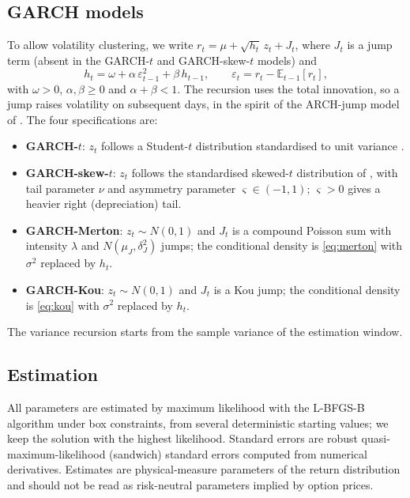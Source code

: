 \documentclass[11pt]{article}
\newcommand{\E}{\mathbb{E}}
\begin{document}
\subsection{GARCH models}

To allow volatility clustering, we write $r_t = \mu + \sqrt{h_t}\, z_t + J_t$, where $J_t$ is a jump term (absent in the GARCH-$t$ and GARCH-skew-$t$ models) and
\begin{equation}\label{eq:garch}
h_t = \omega + \alpha\, \varepsilon_{t-1}^2 + \beta\, h_{t-1}, \qquad \varepsilon_t = r_t - \E_{t-1}[r_t],
\end{equation}
with $\omega>0$, $\alpha,\beta\ge 0$ and $\alpha+\beta<1$. The recursion uses the total innovation, so a jump raises volatility on subsequent days, in the spirit of the ARCH-jump model of \citet{jorion1988}. The four specifications are:
\begin{itemize}
\item \textbf{GARCH-$t$}: $z_t$ follows a Student-$t$ distribution standardised to unit variance \citep{bollerslev1987}.
\item \textbf{GARCH-skew-$t$}: $z_t$ follows the standardised skewed-$t$ distribution of \citet{hansen1994}, with tail parameter $\nu$ and asymmetry parameter $\varsigma\in(-1,1)$; $\varsigma>0$ gives a heavier right (depreciation) tail.
\item \textbf{GARCH-Merton}: $z_t\sim N(0,1)$ and $J_t$ is a compound Poisson sum with intensity $\lambda$ and $N(\mu_J,\delta_J^2)$ jumps; the conditional density is \eqref{eq:merton} with $\sigma^2$ replaced by $h_t$.
\item \textbf{GARCH-Kou}: $z_t\sim N(0,1)$ and $J_t$ is a Kou jump; the conditional density is \eqref{eq:kou} with $\sigma^2$ replaced by $h_t$.
\end{itemize}
The variance recursion starts from the sample variance of the estimation window.

\subsection{Estimation}

All parameters are estimated by maximum likelihood with the L-BFGS-B algorithm under box constraints, from several deterministic starting values; we keep the solution with the highest likelihood. Standard errors are robust quasi-maximum-likelihood (sandwich) standard errors \citep{bollerslevwooldridge1992} computed from numerical derivatives. Estimates are physical-measure parameters of the return distribution and should not be read as risk-neutral parameters implied by option prices.
\end{document}
